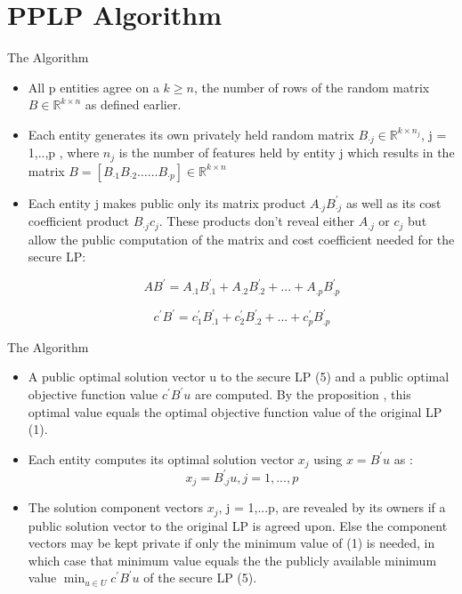 \documentclass[9pt]{beamer}
\begin{document}
\section{PPLP Algorithm}

\begin{frame}{The Algorithm}
\begin{itemize}
    \item All p entities agree on a $ k \geq n $, the number of rows of the random matrix $ B \in \mathbb{R}^{k \times n} $ as defined earlier.
    
    \vspace{0.2cm}
    \item Each entity generates its own privately held random matrix $ B_{·j} \in \mathbb{R}^{k \times n_j} $, j = 1,..,p , where $ n_j $ is the number of features held by entity j which results in the matrix $ B=\left[B_{\cdot 1} B_{\cdot 2} \ldots \ldots B_{\cdot p}\right] \in \mathbb{R}^{k \times n} $
    \vspace{0.2cm}
    
    \item Each entity j makes public only its matrix product $ A_{·j} B_{·j}^′ $ as well as its cost coefficient product $ B_{·j} c_j $. These products don't reveal either $ A_{.j} $ or $ c_j$ but allow the public computation of the matrix and cost coefficient needed for the secure LP:
    
    $$
A B^{\prime}=A_{.1} B_{.1}^{\prime} + A_{.2} B_{.2}^{\prime} +...+ A_{.p} B_{.p}^{\prime}
$$

    $$
c^{\prime} B^{\prime}=c_1^{\prime} B_{.1}^{\prime} + c_2^{\prime} B_{.2}^{\prime}+...+c_p^{\prime} B_{.p}^{\prime}
$$
\end{itemize} 
\end{frame}

\begin{frame}{The Algorithm}
\begin{itemize}
    \item A public optimal solution vector u to the secure LP (5) and a public optimal objective function value $ c^{\prime} B^{′} u $ are computed. By the proposition , this optimal value equals the optimal objective function value of the original LP (1).
    \vspace{0.2cm}
    
    \item Each entity computes its optimal solution vector $ x_j $ using $ x = B^{\prime} u $ as :
    $$ x_j = B_{.j}^{\prime} u , j = 1,...,p $$
    
    \item The solution component vectors $ x_j $, j = 1,...p, are revealed by its owners if a public solution vector to the original LP is agreed upon. Else the component vectors may be kept private if only the minimum value of (1) is needed, in which case that minimum value equals the the publicly available minimum value $ \min _{u \in U} c^{\prime} B^{\prime} u $ of the secure LP (5). 
\end{itemize}  
\end{frame}
\end{document}
